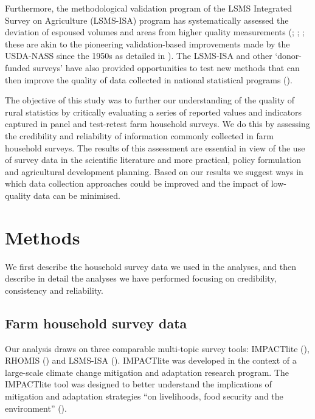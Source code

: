 Furthermore, the methodological validation program of the LSMS Integrated Survey on Agriculture (LSMS-ISA) program has systematically assessed the deviation of espoused volumes and areas from higher quality measurements (\citealp{Gibson2015}; \citealp{Zezza2014}; \citealp{Kilic2013}; these are akin to the pioneering validation-based improvements made by the USDA-NASS since the 1950s as detailed in \citealp{Fecso2011}). The LSMS-ISA and other `donor-funded surveys' have also provided opportunities to test new methods that can then improve the quality of data collected in national statistical programs (\citealp{Jerven2015}).

The objective of this study was to further our understanding of the quality of rural statistics by critically evaluating a series of reported values and indicators captured in panel and test-retest farm household surveys. We do this by assessing the credibility and reliability of information commonly collected in farm household surveys. The results of this assessment are essential in view of the use of survey data in the scientific literature and more practical, policy formulation and agricultural development planning. Based on our results we suggest ways in which data collection approaches could be improved and the impact of low-quality data can be minimised.

\section{Methods}

We first describe the household survey data we used in the analyses, and then describe in detail the analyses we have performed focusing on credibility, consistency and reliability.

\subsection{Farm household survey data}

Our analysis draws on three comparable multi-topic survey tools: IMPACTlite (\citealp{Rufino2013}), RHOMIS (\citealp{Hammond2017225}) and LSMS-ISA (\citealp{WorldBank}). IMPACTlite was developed in the context of a large-scale climate change mitigation and adaptation research program. The IMPACTlite tool was designed to better understand the implications of mitigation and adaptation strategies ``on livelihoods, food security and the environment'' (\citealp[p.~3]{Rufino2013}).

